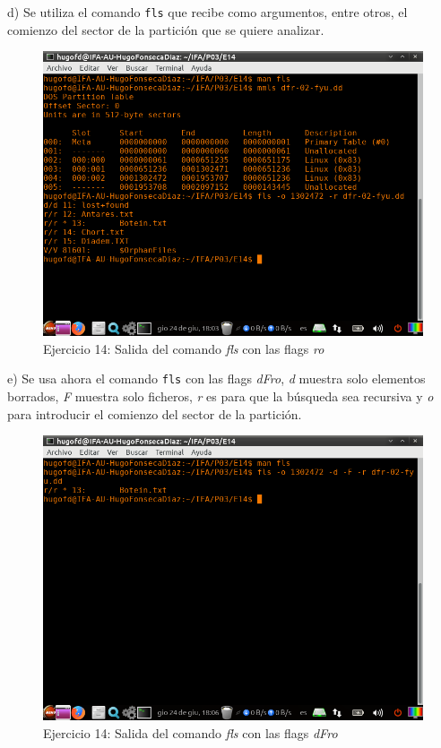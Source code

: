 \documentclass[11pt]{article}
\begin{document}
d) Se utiliza el comando \verb|fls| que recibe como argumentos, entre otros, el comienzo del sector de la partición que se quiere analizar.

\begin{figure}[H]
    \caption{Ejercicio 14: Salida del comando \textit{fls} con las flags \textit{ro}}
    \centering
    \includegraphics[scale=0.7]{e14-3.png}
\end{figure}

e) Se usa ahora el comando \verb|fls| con las flags \textit{dFro}, \textit{d} muestra solo elementos borrados, \textit{F} muestra solo ficheros, \textit{r} es para que la búsqueda sea recursiva y \textit{o} para introducir el comienzo del sector de la partición.

\begin{figure}[H]
    \caption{Ejercicio 14: Salida del comando \textit{fls} con las flags \textit{dFro}}
    \centering
    \includegraphics[scale=0.7]{e14-4.png}
\end{figure}
\end{document}
